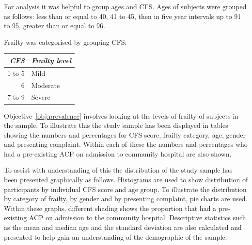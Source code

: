 \documentclass
[
	12pt,
	a4paper,
	oneside,
]{report}
\begin{document}
For analysis it was helpful to group ages and CFS. Ages of subjects were 
grouped as follows: less than or equal to 40, 41 to 45, then in five year 
intervals up to 91 to 95, greater than or equal to 96.


Frailty was categorised by grouping CFS:
\label{ref:cfs-grouping}

\begin{tabular}{ r l }
\emph{CFS} & \emph{Frailty level} \\
\hline
1 to 5	& Mild	\\
6		& Moderate \\
7 to 9	& Severe \\
\end{tabular}

Objective~\ref{obj:prevalence} involves looking at the levels of frailty of
subjects in the sample. To illustrate this the study sample has been 
displayed in tables showing the numbers and percentages for CFS score, 
frailty category, age, gender and presenting complaint. Within each
of these the numbers and percentages who had a pre-existing ACP
on admission to community hospital are also shown.

To assist with understanding of this the distribution of the study sample 
has been presented graphically as follows.
Histograms are used to show distribution of participants by individual 
CFS score and age group.  
To illustrate the distribution by category of frailty, by gender and by presenting 
complaint, pie charts are used. Within these graphs, different shading shows
the proportion that had a pre-existing ACP on admission to the community hospital.
Descriptive statistics such as the mean and median age and the standard deviation
are also calculated and presented to help gain an understanding of the 
demographic of the sample.
\end{document}

